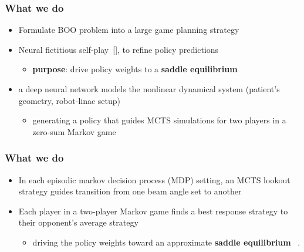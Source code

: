 \begin{frame}
\frametitle{What we do}
\begin{itemize}
	\item Formulate BOO problem into a large game planning strategy
	\vspace{0.3cm}
	\item Neural fictitious self-play~[\cite{Heinrich}], to refine policy predictions
	\begin{itemize}
		\item \textbf{purpose}: drive policy weights to a \textbf{saddle equilibrium}
	\end{itemize}
	\vspace{0.3cm}
	\item a deep neural network models the nonlinear dynamical system (patient's geometry, robot-linac setup)
	\vspace{0.3cm}
	\begin{itemize}
		\item generating a policy that guides MCTS simulations for two  players in a zero-sum Markov game
	\end{itemize}
\end{itemize}
\end{frame}

\begin{frame}
	\frametitle{What we do}
	\begin{itemize}
		\item In each episodic markov decision process (MDP) setting, an MCTS lookout strategy guides transition from one beam angle set to another 
		\vspace{0.3cm}
		\item Each player in a two-player Markov game  finds a best response strategy to their opponent's average strategy 
		\vspace{0.3cm}
		\begin{itemize}
			\item driving the policy weights  toward an approximate \textbf{saddle equilibrium} ~\cite{Heinrich}.
		\end{itemize}
	\end{itemize}
\end{frame}

